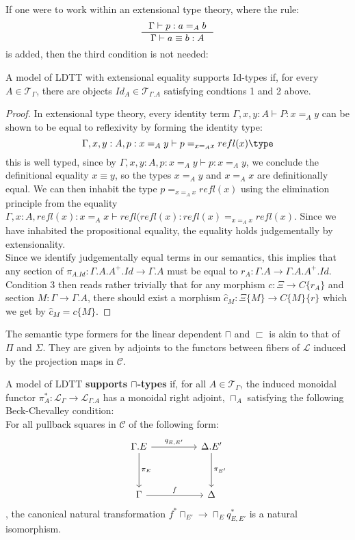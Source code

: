 If one were to work within an extensional type theory, where the rule:
\[
  \inference{\Gamma \vdash p : a =_A b}{\Gamma \vdash a \equiv b : A}
\]
is added, then the third condition is not needed:
\begin{thm}A model of LDTT with extensional equality supports Id-types if, for every $A \in \mathcal{T}_{\Gamma}$, there are objects $Id_A \in \mathcal{T}_{\Gamma.A}$ satisfying condtions 1 and 2 above.
  \begin{proof}
    In extensional type theory, every identity term $\Gamma,x, y : A \vdash P : x =_Ay$ can be shown to be equal to reflexivity by forming the identity type:
    \[
      \Gamma,x,y: A, p : x=_Ay \vdash p =_{x=_Ax}refl(x) \type
    \]
    this is well typed, since by $\Gamma,x,y : A, p : x=_Ay \vdash p : x=_Ay$, we conclude the definitional equality $x \equiv y$, so the types $x=_Ay$ and $x=_Ax$ are definitionally equal. We can then inhabit the type $p =_{x =_Ax}refl(x)$ using the elimination principle from the equality $\Gamma,x : A, refl(x) : x=_Ax \vdash refl(refl(x) : refl(x) =_{x=_Ax}refl(x)$. Since we have inhabited the propositional equality, the equality holds judgementally by extensionality.\\
    Since we identify judgementally equal terms in our semantics, this implies that any section of $\pi_{A.Id} : \Gamma.A.A^+.Id \to \Gamma.A$ must be equal to $r_A : \Gamma.A \to \Gamma.A.A^+.Id$. Condition 3 then reads rather trivially that for any morphism $c : \Xi \to C\{r_A\}$ and section $M : \Gamma \to \Gamma.A$, there should exist a morphism $\hat c_{M} : \Xi\{M\} \to C\{M\}\{r\}$ which we get by $\hat c_M = c\{M\}$.
  \end{proof}
\end{thm}
The semantic type formers for the linear dependent $\sqcap$ and $\sqsubset$ is akin to that of $\Pi$ and $\Sigma$. They are given by adjoints to the functors between fibers of $\mathcal{L}$ induced by the projection maps in $\mathcal{C}$.
\begin{defn}
  A model of LDTT \textbf{supports $\sqcap$-types} if, for all $A \in \mathcal{T}_{\Gamma}$, the induced monoidal functor $\pi_A^* : \mathcal{L}_{\Gamma} \to \mathcal{L}_{\Gamma.A}$ has a monoidal right adjoint, $\sqcap_A$ satisfying the following Beck-Chevalley condition:\\
  For all pullback squares in $\mathcal{C}$ of the following form:
  \[
      \ti
    \Gamma.E \ar[d, "\pi_E"] \ar[r, "q_{E, E'}"] & \Delta.E' \ar[d, "\pi_{E'}"] \\
    \Gamma \ar[r, "f"] & \Delta
    \kz
  \],
the canonical natural transformation $f^*\sqcap_{E'} \to \sqcap_{E}q^*_{E, E'}$ is a natural isomorphism.\\
\end{defn}
